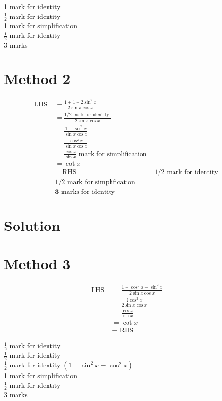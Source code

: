 \documentclass[10pt]{article}
\begin{document}
1 mark for identity\\
$\frac{1}{2}$ mark for identity\\
1 mark for simplification\\
$\frac{1}{2}$ mark for identity\\
3 marks

\section*{Method 2}
$$
\begin{array}{rlr}
\text { LHS } & =\frac{1+1-2 \sin ^{2} x}{2 \sin x \cos x} & \\
& =\frac{1 / 2 \text { mark for identity }}{2 \sin x \cos x} & \\
& =\frac{1-\sin ^{2} x}{\sin x \cos x} & \\
& =\frac{\cos ^{2} x}{\sin x \cos x} & \\
& =\frac{\cos x}{\sin x} \text { mark for simplification } \\
& =\cot x & \\
& =\text { RHS } & 1 / 2 \text { mark for identity } \\
& 1 / 2 \text { mark for simplification } \\
& \mathbf{3} \text { marks for identity }
\end{array}
$$

\section*{Solution}
\section*{Method 3}
$$
\begin{aligned}
\text { LHS } & =\frac{1+\cos ^{2} x-\sin ^{2} x}{2 \sin x \cos x} \\
& =\frac{2 \cos ^{2} x}{2 \sin x \cos x} \\
& =\frac{\cos x}{\sin x} \\
& =\cot x \\
& =\text { RHS }
\end{aligned}
$$

$\frac{1}{2}$ mark for identity\\
$\frac{1}{2}$ mark for identity\\
$\frac{1}{2}$ mark for identity $\left(1-\sin ^{2} x=\cos ^{2} x\right)$\\
1 mark for simplification\\
$\frac{1}{2}$ mark for identity\\
3 marks
\end{document}

